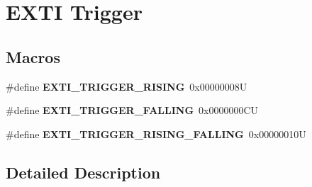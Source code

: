\hypertarget{group___e_x_t_i___trigger}{}\section{E\+X\+TI Trigger}
\label{group___e_x_t_i___trigger}
\subsection*{Macros}
\begin{DoxyCompactItemize}
\item 
\mbox{\label{group___e_x_t_i___trigger_ga648bd5d6c2bebd85b5ea85f8af9a2ccc}} 
\#define {\bfseries E\+X\+T\+I\+\_\+\+T\+R\+I\+G\+G\+E\+R\+\_\+\+R\+I\+S\+I\+NG}~0x00000008U
\item 
\mbox{\label{group___e_x_t_i___trigger_ga7461c33165994159edf79a095c227937}} 
\#define {\bfseries E\+X\+T\+I\+\_\+\+T\+R\+I\+G\+G\+E\+R\+\_\+\+F\+A\+L\+L\+I\+NG}~0x0000000\+CU
\item 
\mbox{\label{group___e_x_t_i___trigger_ga481cea6a2aafe107e5657b65887c81d5}} 
\#define {\bfseries E\+X\+T\+I\+\_\+\+T\+R\+I\+G\+G\+E\+R\+\_\+\+R\+I\+S\+I\+N\+G\+\_\+\+F\+A\+L\+L\+I\+NG}~0x00000010U
\end{DoxyCompactItemize}


\subsection{Detailed Description}
